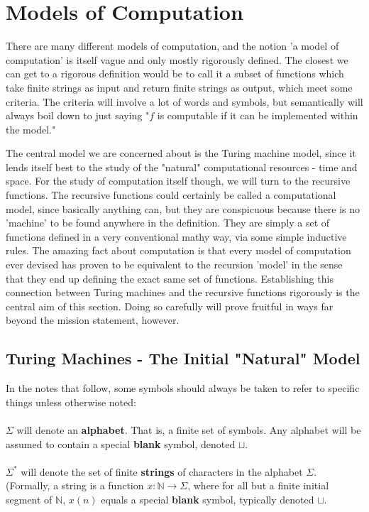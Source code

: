\documentclass{article}
\theoremstyle{definition}
\theoremstyle{plain}
\theoremstyle{theorem}
\begin{document}
\section{Models of Computation}
	There are many different models of computation, and the notion 'a model of computation' is itself vague and only mostly rigorously defined. The closest we can get to a rigorous definition would be to call it a subset of functions which take finite strings as input and return finite strings as output, which meet some criteria. The criteria will involve a lot of words and symbols, but semantically will always boil down to just saying "$f$ is computable if it can be implemented within the model." 
	\par The central model we are concerned about is the Turing machine model, since it lends itself best to the study of the "natural" computational resources - time and space. For the study of computation itself though, we will turn to the recursive functions. The recursive functions could certainly be called a computational model, since basically anything can, but they are conspicuous because there is no 'machine' to be found anywhere in the definition. They are simply a set of functions defined in a very conventional mathy way, via some simple inductive rules. The amazing fact about computation is that every model of computation ever devised has proven to be equivalent to the recursion 'model' in the sense that they end up defining the exact same set of functions. Establishing this connection between Turing machines and the recursive functions rigorously is the central aim of this section. Doing so carefully will prove fruitful in ways far beyond the mission statement, however.
\subsection{Turing Machines - The Initial "Natural" Model}
In the notes that follow, some symbols should always be taken to refer to specific things unless otherwise noted: \\ \\
$\Sigma$ will denote an \textbf{alphabet}. That is, a finite set of symbols. Any alphabet will be assumed to contain a special \textbf{blank} symbol, denoted $\sqcup$. \\ \\
$\Sigma^*$ will denote the set of finite \textbf{strings} of characters in the alphabet $\Sigma$. (Formally, a string is a function $x:\mathbb{N}\to \Sigma$, where for all but a finite initial segment of $\mathbb{N}$, $x(n)$ equals a special \textbf{blank} symbol, typically denoted $\sqcup$. \\ \\
\end{document}
